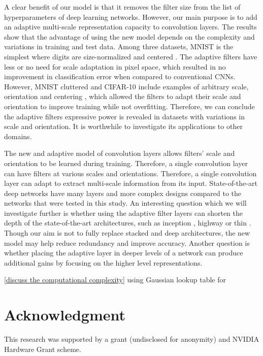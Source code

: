 \documentclass{bmvc2k}
\begin{document}
A clear benefit of our model is that it removes the filter size from the list of hyperparameters of deep learning networks. However, our main purpose is to add an adaptive multi-scale representation capacity to convolution layers. The results show that the advantage of using the new model depends on the complexity and variations in training and test data. Among three datasets, MNIST is the simplest where digits are size-normalized and centered \cite{mnist}. The adaptive filters have less or no need for scale adaptation in pixel space, which resulted in no improvement in classification error when compared to conventional CNNs.
However, MNIST cluttered and CIFAR-10 include examples of arbitrary scale, orientation and centering \cite{cifar10} \cite{mnistcluttered}, which allowed the filters to adapt their scale and orientation to improve training while not overfitting. Therefore, we can conclude the adaptive filters expressive power is revealed in datasets with variations in scale and orientation. It is worthwhile to investigate its applications to other domains.


The new and adaptive model of convolution layers allows filters' scale and orientation to be learned during training. Therefore, a single convolution layer can have filters at various scales and orientations. Therefore, a single convolution layer can adapt to extract multi-scale information from its input. State-of-the-art deep networks have many layers and more complex designs compared to the networks that were tested in this study. An interesting question which we will investigate further is whether using the adaptive filter layers can shorten the depth of the state-of-the-art architectures, such as inception \cite{inceptionv1}, highway \cite{highway} or thin \cite{fitnets}. Though our aim is not to fully replace stacked and deep architectures, the new model may help reduce redundancy and improve accuracy. Another question is whether placing the adaptive layer in deeper levels of a network can produce additional gains by focusing on the higher level representations.

\ref{discuss the computational complexity} using Gaussian lookup table for 


\section{Acknowledgment}
\label{sec:ack}
This research was supported by a grant (undisclosed for anonymity) and NVIDIA Hardware Grant scheme.


\end{document}
